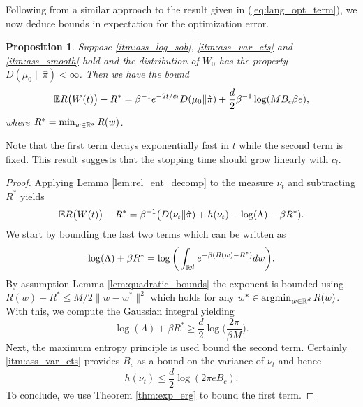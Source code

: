 \documentclass{article}
\newtheorem{proposition}[theorem]{Proposition}
\begin{document}
Following from a similar approach to the result given in (\ref{eq:lang_opt_term}), we now deduce bounds in expectation for the optimization error.
\begin{proposition}\label{prop:opt_error}
Suppose \ref{itm:ass_log_sob}, \ref{itm:ass_var_cts} and \ref{itm:ass_smooth} hold and the distribution of \(W_0\) has the property \(D(\mu_0 \| \hat{\pi}) < \infty\). Then we have the bound
\begin{equation*}
    \Bbb{E} R \big ( W(t) \big ) - R^* = \beta^{-1} e^{-2t/c_l}D(\mu_0 \| \hat{\pi}) + \frac{d}{2} \beta^{-1} \log(MB_c \beta e),
\end{equation*}
where \(R^* = \min_{w \in \Bbb{R}^d} R(w)\).
\end{proposition}
Note that the first term decays exponentially fast in \(t\) while the second term is fixed. This result suggests that the stopping time should grow linearly with \(c_l\).

\begin{proof}
Applying Lemma \ref{lem:rel_ent_decomp} to the measure \(\nu_t\) and subtracting \(R^*\) yields
\begin{equation*}
    \Bbb{E} R \big ( W(t) \big ) - R^* =  \beta^{-1} \big ( D(\nu_t \| \hat{\pi}) + h(\nu_t) - \log(\Lambda) - \beta R^*).
\end{equation*}
We start by bounding the last two terms which can be written as
\begin{equation*}
    \log(\Lambda) + \beta R^* = \log \bigg ( \int_{\Bbb{R}^d} e^{-\beta(R(w) - R^*)} dw \bigg ).
\end{equation*}
By assumption Lemma \ref{lem:quadratic_bounds} the exponent is bounded using \(R(w) - R^* \leq M/2 \|w - w^*\|^2\) which holds for any \(w^* \in \operatorname{argmin}_{w \in \Bbb{R}^d} R(w)\). With this, we compute the Gaussian integral yielding
\begin{equation}\label{eq:opt_error_1}
    \log(\Lambda) + \beta R^* \geq \frac{d}{2} \log \bigg ( \frac{2\pi}{\beta M} \bigg ).
\end{equation}
Next, the maximum entropy principle is used bound the second term. Certainly \ref{itm:ass_var_cts} provides \(B_c\) as a bound on the variance of \(\nu_t\) and hence
\begin{equation}\label{eq:opt_error_2}
    h(\nu_t) \leq \frac{d}{2} \log (2\pi e B_c).
\end{equation}
To conclude, we use Theorem \ref{thm:exp_erg} to bound the first term.
\end{proof}
\end{document}
